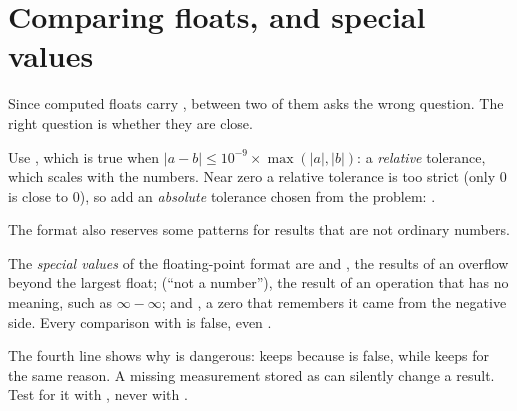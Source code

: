 \section{Comparing floats, and special values}\label{sec:g10:floating-point:compare}

Since computed floats carry , \code{==} between two of them asks the wrong question. The right
question is whether they are close.

\begin{method}\label{met:g10:floating-point:isclose}
Use , which is true when $|a - b| \le 10^{-9} \times \max(|a|, |b|)$: a \emph{relative}
tolerance, which scales with the numbers. Near zero a relative tolerance is too strict (only $0$ is close to $0$), so
add an \emph{absolute} tolerance chosen from the problem: .
\end{method}

The format also reserves some patterns for results that are not ordinary numbers.

\begin{definition}\label{def:g10:floating-point:special}
The \emph{special values} of the floating-point format are  and
, the results of an overflow beyond the largest float;  (``not a number''), the result of an
operation that has no meaning, such as $\infty - \infty$; and , a zero that remembers it came from the
negative side. Every comparison with  is false, even .
\end{definition}

\label{lst:g10:floating-point:compare}

\label{out:g10:floating-point:compare}

The fourth line shows why  is dangerous:  keeps  because  is
false, while  keeps  for the same reason. A missing measurement stored as 
can silently change a result. Test for it with , never with \code{==}.

